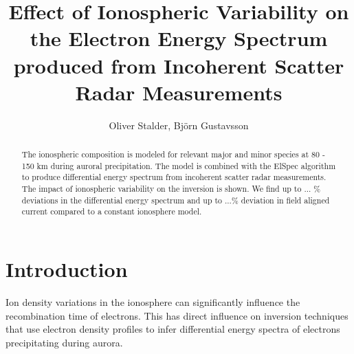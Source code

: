 \documentclass[10pt, a4paper]{article}
\numberwithin{equation}{section}										%
\begin{document}
%
\title{Effect of Ionospheric Variability on the Electron Energy Spectrum produced from Incoherent Scatter Radar Measurements}
\author{Oliver Stalder, Björn Gustavsson}
\maketitle

\begin{abstract}
The ionospheric composition is modeled for relevant major and minor species at 80 - 150 km during auroral precipitation. The model is combined with the ElSpec algorithm \cite{virtanen_electron_2018} to produce differential energy spectrum from incoherent scatter radar measurements. The impact of ionospheric variability on the inversion is shown. We find up to ... \% deviations in the differential energy spectrum and up to ...\% deviation in field aligned current compared to a constant ionosphere model.
\end{abstract}



%
%	
%





















\section{Introduction}
Ion density variations in the ionosphere can significantly influence the recombination time of electrons. This has direct influence on inversion techniques that use electron density profiles to infer differential energy spectra of electrons precipitating during aurora.
\end{document}
